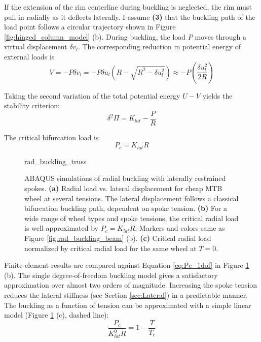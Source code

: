 \documentclass[\rootdir/thesis.tex]{subfiles}
\begin{document}
If the extension of the rim centerline during buckling is neglected, the rim must pull in radially as it deflects laterally. I assume \textbf{(3)} that the buckling path of the load point follows a circular trajectory shown in Figure \ref{fig:hinged_column_model} (b). During buckling, the load $P$ moves through a virtual displacement $\delta v_l$. The corresponding reduction in potential energy of external loads is
\begin{equation}
\label{eq:V_rim_1dof}
V = -P\delta v_l = -P \delta u_l \left(R - \sqrt{R^2 - \delta u_l^2}\right)
\approx -P \left(\frac{\delta u_l^2}{2R}\right)
\end{equation}

Taking the second variation of the total potential energy $U-V$ yields the stability criterion:
\begin{equation}
\label{eq:ddPi_1dof}
\delta^2 \Pi = K_{lat} - \frac{P}{R}
\end{equation}

The critical bifurcation load is
\begin{equation}
\label{eq:Pc_1dof}
P_c = K_{lat}R
\end{equation}

\begin{figure}[h]
\centering
{rad_buckling_truss} 
\caption{ABAQUS simulations of radial buckling with laterally restrained spokes. \textbf{(a)} Radial load vs. lateral displacement for cheap MTB wheel at several tensions. The lateral displacement follows a classical bifurcation buckling path, dependent on spoke tension. \textbf{(b)} For a wide range of wheel types and spoke tensions, the critical radial load is well approximated by $P_c = K_{lat}R$. Markers and colors same as Figure \ref{fig:rad_buckling_beam} (b). \textbf{(c)} Critical radial load normalized by critical radial load for the same wheel at $T=0$.}
\label{fig:rad_buckling_truss}
\end{figure}

Finite-element results are compared against Equation \eqref{eq:Pc_1dof} in Figure \ref{fig:rad_buckling_truss} (b). The single degree-of-freedom buckling model gives a satisfactory approximation over almost two orders of magnitude. Increasing the spoke tension reduces the lateral stiffness (see Section \ref{sec:Lateral}) in a predictable manner. The buckling as a function of tension can be approximated with a simple linear model (Figure \ref{fig:rad_buckling_truss} (c), dashed line):
\begin{equation}
\label{eq:P_c_T}
\frac{P_c}{K_{lat}^0 R} = 1 - \frac{T}{T_c}
\end{equation}
\end{document}
